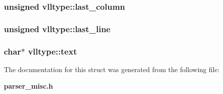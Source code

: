 \subsubsection{\setlength{\rightskip}{0pt plus 5cm}unsigned vlltype::last\_\-column}\label{structvlltype_m3}


\subsubsection{\setlength{\rightskip}{0pt plus 5cm}unsigned vlltype::last\_\-line}\label{structvlltype_m2}


\subsubsection{\setlength{\rightskip}{0pt plus 5cm}char$\ast$ vlltype::text}\label{structvlltype_m4}




The documentation for this struct was generated from the following file:\begin{CompactItemize}
\item 
{\bf parser\_\-misc.h}\end{CompactItemize}

